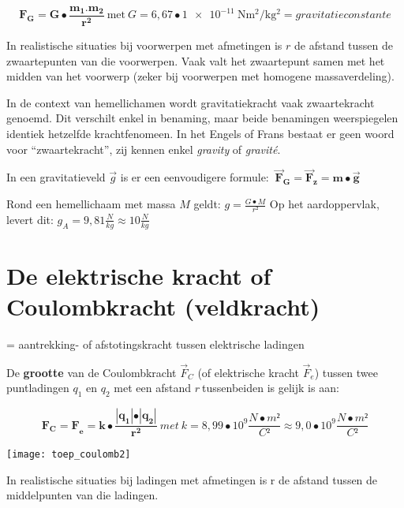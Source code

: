 \documentclass{ximera}
\begin{document}
\[\mathbf{F}_{\mathbf{G}}\mathbf{= G \bullet}\frac{\mathbf{m}_{\mathbf{1}}{\mathbf{.}\mathbf{m}}_{\mathbf{2}}}{\mathbf{r}^{\mathbf{2}}}\ \text{met} \ G = 6,67 \bullet \SI{1e-11}{\newton\meter\squared\per\kilo\gram\squared} = gravitatieconstante\]

In realistische situaties bij voorwerpen met afmetingen is \(r\) de afstand tussen de zwaartepunten van die voorwerpen. 
Vaak valt het zwaartepunt samen met het midden van het voorwerp (zeker bij voorwerpen met homogene massaverdeling).

In de context van hemellichamen wordt gravitatiekracht vaak zwaartekracht genoemd. 
Dit verschilt enkel in benaming, maar beide benamingen weerspiegelen identiek hetzelfde krachtfenomeen. 
In het Engels of Frans bestaat er geen woord voor ``zwaartekracht'', zij kennen enkel \emph{gravity} of \emph{gravité}.

In een gravitatieveld \(\overrightarrow{g}\) is er een eenvoudigere formule:
\(\ {\overrightarrow{\mathbf{F}}}_{\mathbf{G}}\mathbf{=}{\overrightarrow{\mathbf{F}}}_{\mathbf{z}}\mathbf{= m \bullet}\overrightarrow{\mathbf{g}}\mathbf{\ }\)

Rond een hemellichaam met massa \(M\) geldt:
\(g = \frac{G \bullet M}{r²}\) 
Op het aardoppervlak, levert dit:
\(g_{A} = 9,81\frac{N}{kg} \approx 10\frac{N}{kg}\)


\section*{De elektrische kracht of Coulombkracht (veldkracht)}

= aantrekking- of afstotingskracht tussen elektrische ladingen

De \textbf{grootte} van de Coulombkracht \({\overrightarrow{F}}_{C}\)
(of elektrische kracht \({\overrightarrow{F}}_{e}\)) tussen twee
puntladingen \(q_{1}\) en \(q_{2}\) met een afstand \(r\ \)tussenbeiden
is gelijk is aan:

\[{\mathbf{F}_{\mathbf{C}}\mathbf{=}\mathbf{F}}_{\mathbf{e}}\mathbf{= k \bullet}\frac{\left| \mathbf{q}_{\mathbf{1}} \right|\mathbf{\bullet}\left| \mathbf{q}_{\mathbf{2}} \right|}{\mathbf{r}^{\mathbf{2}}}\ met\ k = 8,99 \bullet 10^{9}\frac{N \bullet m²}{C²} \approx 9,0 \bullet 10^{9}\frac{N \bullet m²}{C²}\]

\begin{image}
  \texttt{[image: toep\_coulomb2]}
\end{image}

In realistische situaties bij ladingen met afmetingen is r de afstand tussen de middelpunten van die ladingen.
\end{document}
